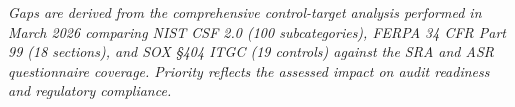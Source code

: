 \documentclass[11pt,landscape]{article}
\begin{document}
{\small\textit{Gaps are derived from the comprehensive control-target analysis performed in
March 2026 comparing NIST CSF 2.0 (100 subcategories), FERPA 34 CFR Part 99 (18 sections),
and SOX §404 ITGC (19 controls) against the SRA and ASR questionnaire coverage.
Priority reflects the assessed impact on audit readiness and regulatory compliance.}}
\end{document}

